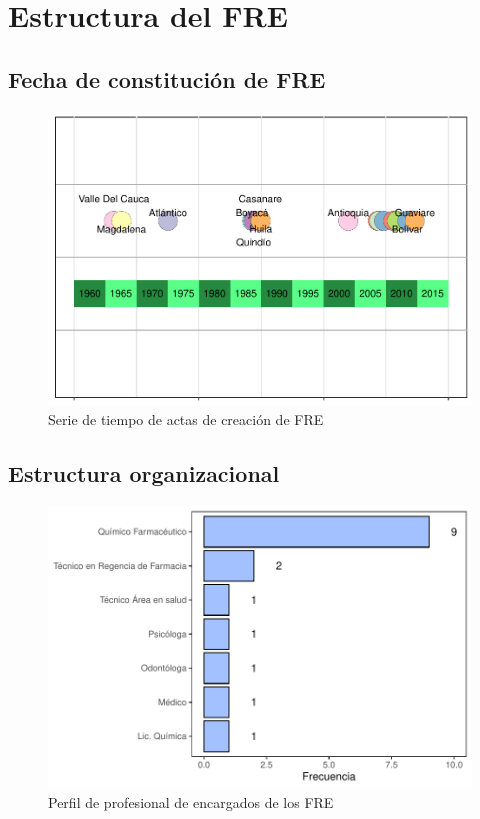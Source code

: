 \documentclass[
]{book}
\begin{document}
\hypertarget{estructura-del-fre}{%
\chapter{Estructura del FRE}\label{estructura-del-fre}}


\hypertarget{fecha-de-constituciuxf3n-de-fre}{%
\section{Fecha de constitución de FRE}\label{fecha-de-constituciuxf3n-de-fre}}

\begin{figure}
\includegraphics[width=1\linewidth,height=0.2\textheight]{InformeFinal_files/figure-latex/serieTiempoCreacion-1} \caption{Serie de tiempo de actas de creación de FRE}\label{fig:serieTiempoCreacion}
\end{figure}

\hypertarget{estructura-organizacional}{%
\section{Estructura organizacional}\label{estructura-organizacional}}

\begin{figure}
\includegraphics[width=0.85\linewidth]{InformeFinal_files/figure-latex/perfilProfesionalEncargado-1} \caption{Perfil de profesional de encargados de los FRE}\label{fig:perfilProfesionalEncargado}
\end{figure}
\end{document}
